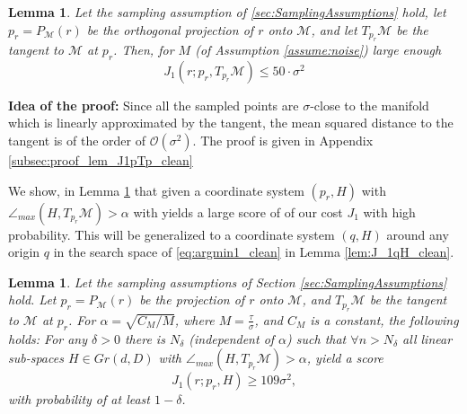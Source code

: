 \documentclass[12pt]{article}
\newtheorem{Lemma}[Theorem]{Lemma}
\theoremstyle{remark}
\newcommand{\MM}{\mathcal{M}}
\newcommand{\OO}{\mathcal{O}}
\begin{document}
\begin{Lemma}\label{lem:J1pTp_clean}
Let the sampling assumption of \ref{sec:SamplingAssumptions} hold, let ${p_r} = P_\MM(r)$ be the orthogonal projection of $r$ onto $\MM$, and let $ T_{p_r}\MM $ be the tangent to $ \MM $ at $ {p_r} $.
Then, for $M$ (of Assumption \ref{assume:noise}) large enough
    \begin{equation}\label{eq:TangentScore_clean}
       J_1(r; {p_r}, T_{{p_r}}\MM) \leq 50 \cdot \sigma^2 
    \end{equation}
\end{Lemma}
\textbf{Idea of the proof: } Since all the sampled points are $\sigma$-close to the manifold which is linearly approximated by the tangent, the mean squared distance to the tangent is of the order of $\OO(\sigma^2)$.
The proof is given in Appendix \ref{subsec:proof_lem_J1pTp_clean}


We show, in Lemma \ref{thm:J1pH_clean} that given a coordinate system $(p_r, H)$ with $\angle_{max}(H,T_{{p_r}}\MM) > \alpha$ with yields a large score of of our cost $J_1$ with high probability.
This will be generalized to a coordinate system $(q, H)$ around any origin $q$ in the search space of \eqref{eq:argmin1_clean} in Lemma \ref{lem:J_1qH_clean}.

\begin{Lemma}\label{thm:J1pH_clean}
    Let the sampling assumptions of Section \ref{sec:SamplingAssumptions} hold.
    Let ${p_r} = P_\MM(r)$ be the projection of $r$ onto $\MM$, and $ T_{p_r}\MM $ be the tangent to $ \MM $ at $ {p_r} $. 
    For $\alpha = \sqrt{C_M/M}$, where $M = \frac{\tau}{\sigma}$, and $C_M$ is a constant,
    the following holds: For any $\delta >0$ there is $N_\delta$ (independent of $\alpha$) such that $\forall n > N_\delta$ all linear sub-spaces $H\in Gr(d,D)$ with $\angle_{max}(H,T_{{p_r}}\MM) > \alpha$, yield a score 
    \[J_1(r; {p_r}, H) \geq 109 \sigma^2 ,\]
    with probability of at least $1 - \delta$.
\end{Lemma}
\end{document}

